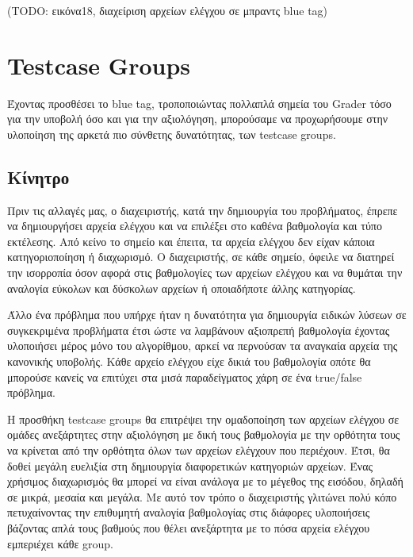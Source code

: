 \documentclass[diploma]{softlab-thesis}
\begin{document}
(TODO: εικόνα18, διαχείριση αρχείων ελέγχου σε μπραντς blue tag)


\section{Testcase Groups}

Έχοντας προσθέσει το blue tag, τροποποιώντας πολλαπλά σημεία του Grader τόσο
για την υποβολή όσο και για την αξιολόγηση, μπορούσαμε να προχωρήσουμε στην
υλοποίηση της αρκετά πιο σύνθετης δυνατότητας, των testcase groups.

\subsection{Κίνητρο}

Πριν τις αλλαγές μας, ο διαχειριστής, κατά την δημιουργία του προβλήματος,
έπρεπε να δημιουργήσει αρχεία ελέγχου και να επιλέξει στο καθένα βαθμολογία και
τύπο εκτέλεσης. Από κείνο το σημείο και έπειτα, τα αρχεία ελέγχου δεν είχαν
κάποια κατηγοριοποίηση ή διαχωρισμό. Ο διαχειριστής, σε κάθε σημείο, όφειλε να
διατηρεί την ισορροπία όσον αφορά στις βαθμολογίες των αρχείων ελέγχου και να
θυμάται την αναλογία εύκολων και δύσκολων αρχείων ή οποιαδήποτε άλλης
κατηγορίας.

\bigskip

Άλλο ένα πρόβλημα που υπήρχε ήταν η δυνατότητα για δημιουργία ειδικών λύσεων σε
συγκεκριμένα προβλήματα έτσι ώστε να λαμβάνουν αξιοπρεπή βαθμολογία έχοντας
υλοποιήσει μέρος μόνο του αλγορίθμου, αρκεί να περνούσαν τα αναγκαία αρχεία της
κανονικής υποβολής. Κάθε αρχείο ελέγχου είχε δικιά του βαθμολογία οπότε θα
μπορούσε κανείς να επιτύχει στα μισά παραδείγματος χάρη σε ένα true/false
πρόβλημα.

\bigskip

Η προσθήκη testcase groups θα επιτρέψει την ομαδοποίηση των αρχείων ελέγχου σε
ομάδες ανεξάρτητες στην αξιολόγηση με δική τους βαθμολογία με την ορθότητα τους
να κρίνεται από την ορθότητα όλων των αρχείων ελέγχουν που περιέχουν. Έτσι, θα
δοθεί μεγάλη ευελιξία στη δημιουργία διαφορετικών κατηγοριών αρχείων. Ένας
χρήσιμος διαχωρισμός θα μπορεί να είναι ανάλογα με το μέγεθος της εισόδου,
δηλαδή σε μικρά, μεσαία και μεγάλα. Με αυτό τον τρόπο ο διαχειριστής γλιτώνει
πολύ κόπο πετυχαίνοντας την επιθυμητή αναλογία βαθμολογίας στις διάφορες
υλοποιήσεις βάζοντας απλά τους βαθμούς που θέλει ανεξάρτητα με το πόσα αρχεία
ελέγχου εμπεριέχει κάθε group.

\bigskip
\end{document}
